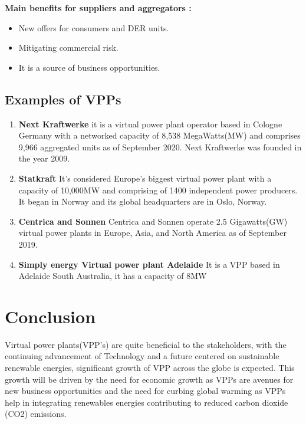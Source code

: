 \documentclass[nonacm,sigconf,12pt]{acmart}
\begin{document}
\textbf{Main benefits for suppliers and aggregators :} 
\begin{itemize}
    \item New offers for consumers and DER units. 
    \item Mitigating commercial risk.
    \item It is a source of  business opportunities.
\end{itemize}

\subsection*{Examples of VPPs}
\begin{enumerate}
  \item \textbf{Next Kraftwerke} \newline
  it is a virtual power plant operator based in Cologne Germany with a networked capacity of 8,538 MegaWatts(MW) and comprises 9,966 aggregated units as of September 2020. Next Kraftwerke was founded in the year 2009. \cite{nextkraftwerke_virtual}
  \item \textbf{Statkraft} \newline
  It’s considered Europe's biggest virtual power plant with a capacity of 10,000MW and comprising of 1400 independent power producers. It began in Norway and its global headquarters are in Oslo, Norway. \cite{actionrenewablescouk_2020_virtual}
  \item \textbf{Centrica and Sonnen} \newline
  Centrica and Sonnen operate 2.5 Gigawatts(GW) virtual power plants in Europe, Asia, and North America as of September 2019. \cite{centrica_stackpath}
  \item \textbf{Simply energy Virtual power plant Adelaide} \newline
  It is a VPP based in Adelaide South Australia, it has a capacity of 8MW\cite{theguardian_2016_adelaide}
\end{enumerate}


\section*{Conclusion}
Virtual power plants(VPP’s) are quite beneficial to the stakeholders, with the continuing advancement of Technology and a   future centered on sustainable renewable energies, significant growth of VPP across the globe is expected.  This growth will be driven by the need for economic growth as VPPs are avenues for new business opportunities and the need for curbing global warming as VPPs help in integrating renewables energies contributing to reduced carbon dioxide (CO2) emissions.



\end{document}
